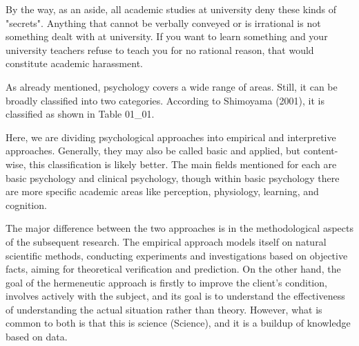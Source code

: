 \documentclass{ltjsbook}
\begin{document}
By the way, as an aside, all academic studies at university deny these kinds of "secrets". Anything that cannot be verbally conveyed or is irrational is not something dealt with at university. If you want to learn something and your university teachers refuse to teach you for no rational reason, that would constitute academic harassment.

As already mentioned, psychology covers a wide range of areas. Still, it can be broadly classified into two categories. According to Shimoyama (2001), it is classified as shown in Table 01\_01.


Here, we are dividing psychological approaches into empirical and interpretive approaches. Generally, they may also be called basic and applied, but content-wise, this classification is likely better. The main fields mentioned for each are basic psychology and clinical psychology, though within basic psychology there are more specific academic areas like perception, physiology, learning, and cognition.

The major difference between the two approaches is in the methodological aspects of the subsequent research. The empirical approach models itself on natural scientific methods, conducting experiments and investigations based on objective facts, aiming for theoretical verification and prediction. On the other hand, the goal of the hermeneutic approach is firstly to improve the client's condition, involves actively with the subject, and its goal is to understand the effectiveness of understanding the actual situation rather than theory. However, what is common to both is that this is science (Science), and it is a buildup of knowledge based on data.
\end{document}
